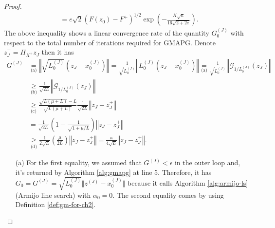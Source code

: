 \documentclass[12pt]{report}
\begin{document}
\begin{proof}
\begin{align*}
                &= e\sqrt{2}(F(z_0) - F^+)^{1/2}\exp\left(
                    - \frac{K\sqrt{\kappa}}{16\sqrt{2 + 2e}}
                \right). 
            \end{align*}
            The above inequality shows a linear convergence rate of the quantity $G_0^{(J)}$ with respect to the total number of iterations required for GMAPG. 
            Denote $z_J^+ = \Pi_{X^+}z_J$ then it has 
            {\allowdisplaybreaks
            \begin{align*}
                G^{(J)} 
                &\underset{\text{(a)}}{=}\left\Vert \sqrt{L_0^{(J)}} \left(z_J - x_0^{(J)}\right) \right\Vert 
                = \frac{1}{\sqrt{L_0^{(J)}}} \left\Vert 
                    L_0^{(J)}\left(
                        z_J - x_0^{(J)}
                    \right)
                \right\Vert
                \underset{\text{(a)}}{=}\frac{1}{\sqrt{L_0^{(J)}}} \left\Vert 
                    \mathcal G_{1/L_0^{(J)}}(z_J)
                \right\Vert
                \\
                &\underset{\text{(b)}}{\ge} \frac{1}{\sqrt{2L}}\left\Vert\mathcal G_{1/L_0^{(J)}}(z_J)\right\Vert
                \\
                &\underset{\text{(c)}}{\ge} \frac{\sqrt{L(\mu + L)} - L}{\sqrt{L(\mu + L)}} \frac{1}{\sqrt{2L}}\left\Vert
                    z_J - z_J^+
                \right\Vert
                \\
                &= \frac{1}{\sqrt{2L}}\left(
                    1 - \frac{1}{\sqrt{1 + \mu/L}}
                \right)\left\Vert
                    z_J - z_J^+
                \right\Vert
                \\
                &\underset{\text{(d)}}{\ge} \frac{1}{2\sqrt{L}}\left(
                    \frac{\mu}{2L}
                \right)\left\Vert
                    z_J - z_J^+
                \right\Vert 
                = \frac{\kappa}{4\sqrt{L}} \left\Vert
                    z_J - z_J^+
                \right\Vert. 
            \end{align*}
            }
            \begin{enumerate}
                \item [(a)] For the first equality, we assumed that $G^{(J)} < \epsilon$ in the outer loop and, it's returned by Algorithm \ref{alg:gmapg} at line 5. Therefore, it has $G_0 = G^{(J)} = \sqrt{L^{(J)}_0} \Vert z^{(J)} - x_0^{(J)}\Vert$ because it calls Algorithm \ref{alg:armijo-ls} (Armijo line search) with $\alpha_0 = 0$. The second equality comes by using Definition \ref{def:gm-for-ch2}. 

\end{enumerate}
\end{proof}
\end{document}
